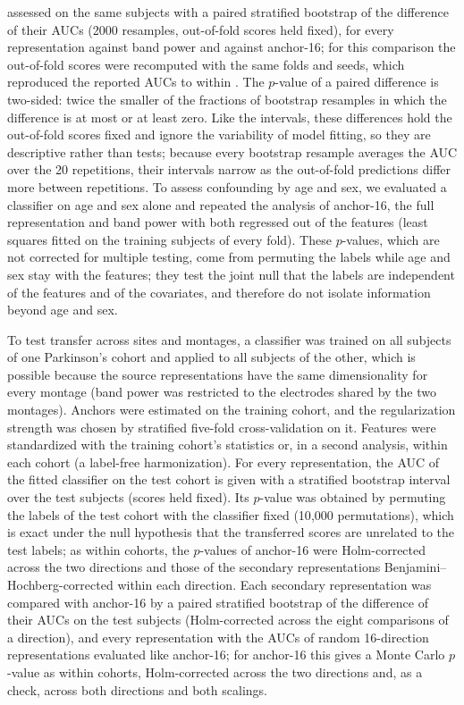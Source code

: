 \documentclass[10pt,letterpaper]{article}
\begin{document}
assessed on the same subjects with a paired stratified bootstrap of the difference of their AUCs
(2000 resamples, out-of-fold scores held fixed), for every representation against band power and
against anchor-16; for this comparison the out-of-fold scores were recomputed with the same folds and
seeds, which reproduced the reported AUCs to within \PairedMaxDeviation. The $p$-value of a paired
difference is two-sided: twice the smaller of the fractions of bootstrap resamples in which the
difference is at most or at least zero. Like the intervals, these differences hold the out-of-fold
scores fixed and ignore the variability of model fitting, so they are descriptive rather than tests;
because every bootstrap resample averages the AUC over the 20 repetitions, their intervals narrow as
the out-of-fold predictions differ more between repetitions. To assess confounding by age and sex, we
evaluated a classifier on age and sex alone and repeated the analysis of anchor-16, the full
representation and band power with both regressed out of the features (least squares fitted on the
training subjects of every fold). These $p$-values, which are not corrected for multiple testing, come
from permuting the labels while age and sex stay with the features; they test the joint null that the
labels are independent of the features and of the covariates, and therefore do not isolate
information beyond age and sex.

To test transfer across sites and montages, a classifier was trained on all subjects of one
Parkinson's cohort and applied to all subjects of the other, which is possible because the source
representations have the same dimensionality for every montage (band power was restricted to the
\TransferSharedChannels{} electrodes shared by the two montages). Anchors were estimated on the
training cohort, and the regularization strength was chosen by stratified five-fold
cross-validation on it. Features were standardized with the training cohort's statistics or,
in a second analysis, within each cohort (a label-free harmonization). For every representation, the AUC of the
fitted classifier on the test cohort is given with a stratified bootstrap interval over the test
subjects (scores held fixed). Its $p$-value was obtained by permuting the labels of the test
cohort with the classifier fixed (10{,}000 permutations), which is exact under the null hypothesis
that the transferred scores are unrelated to the test labels; as within cohorts, the $p$-values of
anchor-16 were Holm-corrected across the two directions and those of the secondary
representations Benjamini--Hochberg-corrected within each direction. Each secondary representation
was compared with anchor-16 by a paired stratified bootstrap of the difference of their AUCs on the
test subjects (Holm-corrected across the eight comparisons of a direction), and every
representation with the AUCs of \TransferIowaToUCSDRandN{} random 16-direction representations
evaluated like anchor-16; for anchor-16 this gives a Monte Carlo $p$-value as within cohorts,
Holm-corrected across the two directions and, as a check, across both directions and both scalings.
\end{document}
